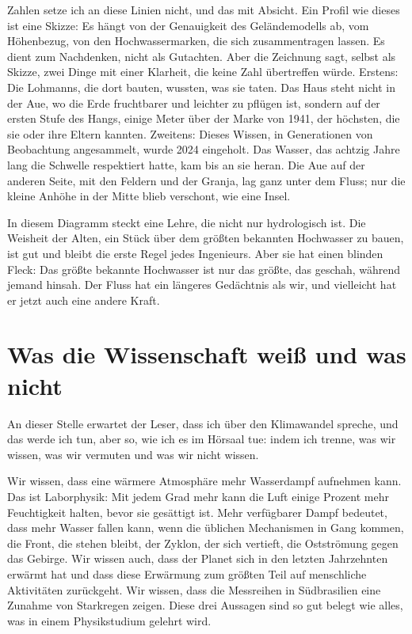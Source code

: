 \documentclass[
  ngerman,
  11pt,
  openany]{book}
\begin{document}
Zahlen setze ich an diese Linien nicht, und das mit Absicht. Ein Profil
wie dieses ist eine Skizze: Es hängt von der Genauigkeit des
Geländemodells ab, vom Höhenbezug, von den Hochwassermarken, die sich
zusammentragen lassen. Es dient zum Nachdenken, nicht als Gutachten.
Aber die Zeichnung sagt, selbst als Skizze, zwei Dinge mit einer
Klarheit, die keine Zahl übertreffen würde. Erstens: Die Lohmanns, die
dort bauten, wussten, was sie taten. Das Haus steht nicht in der Aue, wo
die Erde fruchtbarer und leichter zu pflügen ist, sondern auf der ersten
Stufe des Hangs, einige Meter über der Marke von 1941, der höchsten, die
sie oder ihre Eltern kannten. Zweitens: Dieses Wissen, in Generationen
von Beobachtung angesammelt, wurde 2024 eingeholt. Das Wasser, das
achtzig Jahre lang die Schwelle respektiert hatte, kam bis an sie heran.
Die Aue auf der anderen Seite, mit den Feldern und der Granja, lag ganz
unter dem Fluss; nur die kleine Anhöhe in der Mitte blieb verschont, wie
eine Insel.

In diesem Diagramm steckt eine Lehre, die nicht nur hydrologisch ist.
Die Weisheit der Alten, ein Stück über dem größten bekannten Hochwasser
zu bauen, ist gut und bleibt die erste Regel jedes Ingenieurs. Aber sie
hat einen blinden Fleck: Das größte bekannte Hochwasser ist nur das
größte, das geschah, während jemand hinsah. Der Fluss hat ein längeres
Gedächtnis als wir, und vielleicht hat er jetzt auch eine andere Kraft.

\section{Was die Wissenschaft weiß und was
nicht}\label{was-die-wissenschaft-weiuxdf-und-was-nicht}

An dieser Stelle erwartet der Leser, dass ich über den Klimawandel
spreche, und das werde ich tun, aber so, wie ich es im Hörsaal tue:
indem ich trenne, was wir wissen, was wir vermuten und was wir nicht
wissen.

Wir wissen, dass eine wärmere Atmosphäre mehr Wasserdampf aufnehmen
kann. Das ist Laborphysik: Mit jedem Grad mehr kann die Luft einige
Prozent mehr Feuchtigkeit halten, bevor sie gesättigt ist. Mehr
verfügbarer Dampf bedeutet, dass mehr Wasser fallen kann, wenn die
üblichen Mechanismen in Gang kommen, die Front, die stehen bleibt, der
Zyklon, der sich vertieft, die Ostströmung gegen das Gebirge. Wir wissen
auch, dass der Planet sich in den letzten Jahrzehnten erwärmt hat und
dass diese Erwärmung zum größten Teil auf menschliche Aktivitäten
zurückgeht. Wir wissen, dass die Messreihen in Südbrasilien eine Zunahme
von Starkregen zeigen. Diese drei Aussagen sind so gut belegt wie alles,
was in einem Physikstudium gelehrt wird.
\end{document}
